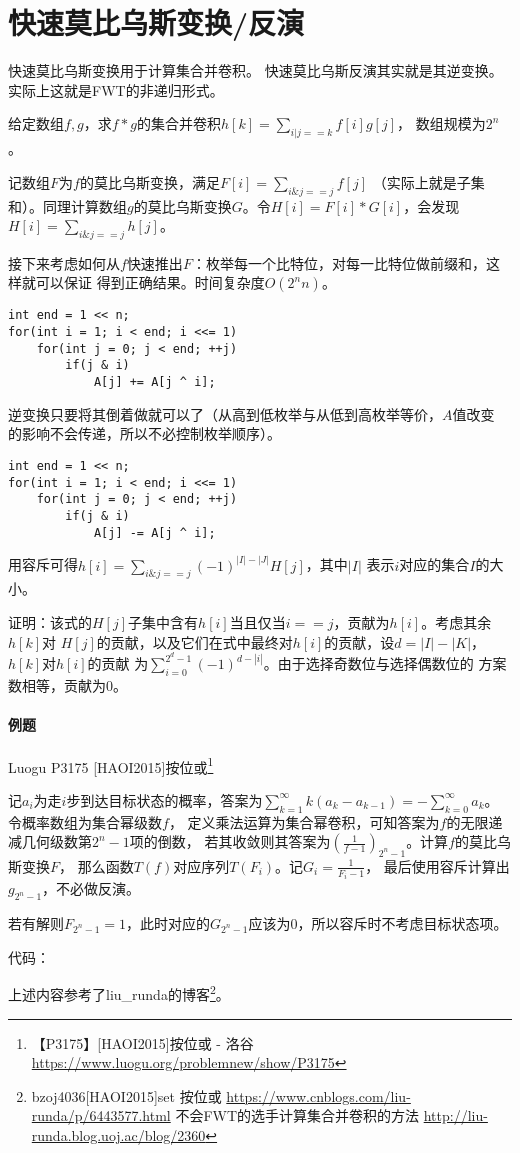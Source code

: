 \section{快速莫比乌斯变换/反演}\label{FMT}
快速莫比乌斯变换用于计算集合并卷积。
快速莫比乌斯反演其实就是其逆变换。
实际上这就是FWT的非递归形式。

给定数组$f,g$，求$f*g$的集合并卷积$\displaystyle h[k]=\sum_{i|j==k}{f[i]g[j]}$，
数组规模为$2^n$。

记数组$F$为$f$的莫比乌斯变换，满足$\displaystyle F[i]=\sum_{i\&j==j}{f[j]}$
（实际上就是子集和）。同理计算数组$g$的莫比乌斯变换$G$。令$H[i]=F[i]*G[i]$，会发现
$\displaystyle H[i]=\sum_{i\&j==j}{h[j]}$。

接下来考虑如何从$f$快速推出$F$：枚举每一个比特位，对每一比特位做前缀和，这样就可以保证
得到正确结果。时间复杂度$O(2^nn)$。
\begin{lstlisting}
int end = 1 << n;
for(int i = 1; i < end; i <<= 1)
    for(int j = 0; j < end; ++j)
        if(j & i)
            A[j] += A[j ^ i];
\end{lstlisting}

逆变换只要将其倒着做就可以了（从高到低枚举与从低到高枚举等价，$A$值改变
的影响不会传递，所以不必控制枚举顺序）。
\begin{lstlisting}
int end = 1 << n;
for(int i = 1; i < end; i <<= 1)
    for(int j = 0; j < end; ++j)
        if(j & i)
            A[j] -= A[j ^ i];
\end{lstlisting}

用容斥可得$\displaystyle h[i]=\sum_{i\&j==j}{(-1)^{|I|-|J|}H[j]}$，其中$|I|$
表示$i$对应的集合$I$的大小。

证明：该式的$H[j]$子集中含有$h[i]$当且仅当$i==j$，贡献为$h[i]$。考虑其余$h[k]$对
$H[j]$的贡献，以及它们在式中最终对$h[i]$的贡献，设$d=|I|-|K|$，$h[k]$对$h[i]$的贡献
为$\displaystyle \sum_{i=0}^{2^d-1}{(-1)^{d-|i|}}$。由于选择奇数位与选择偶数位的
方案数相等，贡献为0。

\paragraph{例题}
Luogu P3175 [HAOI2015]按位或\footnote{
    【P3175】[HAOI2015]按位或 - 洛谷
    \url{https://www.luogu.org/problemnew/show/P3175}
}

记$a_i$为走$i$步到达目标状态的概率，答案为$\displaystyle \sum_{k=1}^
\infty{k(a_k-a_{k-1})}=-\sum_{k=0}^\infty a_k$。令概率数组为集合幂级数$f$，
定义乘法运算为集合幂卷积，可知答案为$f$的无限递减几何级数第$2^n-1$项的倒数，
若其收敛则其答案为$\left(\frac{1}{f-1}\right)_{2^n-1}$。计算$f$的莫比乌斯变换$F$，
那么函数$T(f)$对应序列${T(F_i)}$。记$G_i={\frac{1}{F_i-1}}$，
最后使用容斥计算出$g_{2^n-1}$，不必做反演。

若有解则$F_{2^n-1}=1$，此时对应的$G_{2^n-1}$应该为0，所以容斥时不考虑目标状态项。

代码：


上述内容参考了liu\_runda的博客\footnote{
    bzoj4036[HAOI2015]set 按位或
    \url{https://www.cnblogs.com/liu-runda/p/6443577.html}
    不会FWT的选手计算集合并卷积的方法
    \url{http://liu-runda.blog.uoj.ac/blog/2360}
}。
